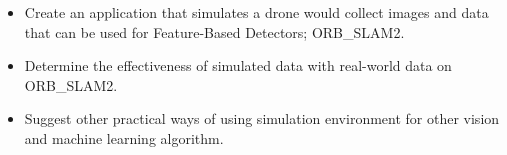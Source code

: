 \begin{itemize} 
	\item Create an application that simulates a drone would collect images and data that can be used for Feature-Based Detectors; ORB\_SLAM2.
	\item Determine the effectiveness of simulated data with real-world data on ORB\_SLAM2.
	\item Suggest other practical ways of using simulation environment for other vision and machine learning algorithm.
\end{itemize}
